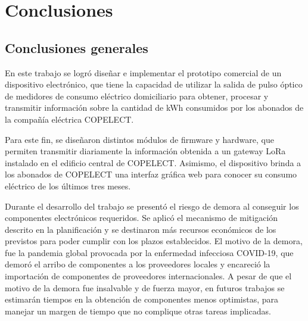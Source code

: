 
\chapter{Conclusiones} %

\label{Chapter5} %




\section{Conclusiones generales }

En este trabajo se logró diseñar e implementar el prototipo comercial de un dispositivo electrónico, que tiene la capacidad de utilizar la salida de pulso óptico de medidores de consumo eléctrico domiciliario para obtener, procesar y transmitir información sobre la cantidad de kWh consumidos por los abonados de la compañía eléctrica COPELECT.

Para este fin, se diseñaron distintos módulos de firmware y hardware, que permiten transmitir diariamente la información obtenida a un gateway LoRa instalado en el edificio central de COPELECT. Asimismo, el dispositivo brinda a los abonados de COPELECT una interfaz gráfica web para conocer su consumo eléctrico de los últimos tres meses.

Durante el desarrollo del trabajo se presentó el riesgo de demora al conseguir los componentes electrónicos requeridos. Se aplicó el mecanismo de mitigación descrito en la planificación y se destinaron más recursos económicos de los previstos para poder cumplir con los plazos establecidos. El motivo de la demora, fue la pandemia global provocada por la enfermedad infecciosa COVID-19, que demoró el arribo de componentes a los proveedores locales y encareció la importación de componentes de proveedores internacionales. A pesar de que el motivo de la demora fue insalvable y de fuerza mayor, en futuros trabajos se estimarán tiempos en la obtención de componentes menos optimistas, para manejar un margen de tiempo que no complique otras tareas implicadas.

